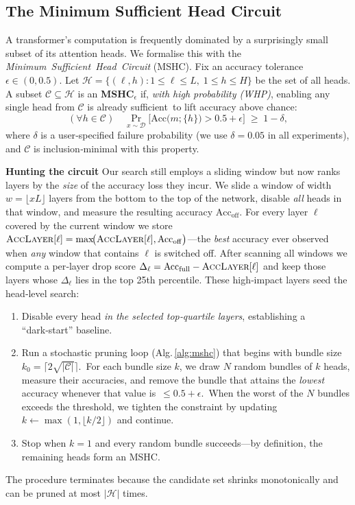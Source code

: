 \documentclass{article}
\begin{document}
\subsection{The Minimum Sufficient Head Circuit}
\label{subsec:mshc}

A transformer’s computation is frequently dominated by a surprisingly
small subset of its attention heads.  We formalise this with the
\emph{Minimum Sufficient Head Circuit} (MSHC).  Fix an accuracy tolerance
$\epsilon\in(0,0.5)$.  Let
$\mathcal H=\{(\ell,h):1\le\ell\le L,\;1\le h\le H\}$ be the set of all
heads.  A subset $\mathcal C\subseteq\mathcal H$ is an
\textbf{MSHC}${}_{\!\epsilon}$ if, \emph{with high probability (WHP)}, enabling any single head from $\mathcal C$ is already sufficient to lift accuracy above chance:
\[
  (\forall h\in\mathcal C)\quad
  \Pr_{x\sim\mathcal D}\!\bigl[\mathrm{Acc}\bigl(m;\{h\}\bigr) > 0.5+\epsilon\bigr] \;\ge\; 1-\delta,
\]
where $\delta$ is a user‑specified failure probability (we use $\delta=0.05$ in all experiments), and $\mathcal C$ is inclusion‑minimal with this property.


%
\noindent\textbf{Hunting the circuit}
Our search still employs a sliding window but now ranks layers by the \emph{size} of the accuracy loss they incur.  
We slide a window of width $w=\lfloor xL\rfloor$ layers from the bottom to the top of the network, disable \emph{all} heads in that window, and measure the resulting accuracy $\mathrm{Acc}_{\mathrm{off}}$.  
For every layer $\ell$ covered by the current window we store  
$\textsc{AccLayer}[\ell]=\max\!\bigl(\textsc{AccLayer}[\ell],\mathrm{Acc}_{\mathrm{off}}\bigr)$—the \emph{best} accuracy ever observed when \emph{any} window that contains $\ell$ is switched off.  
After scanning all windows we compute a per‑layer drop score  
$\Delta_\ell=\mathrm{Acc}_{\mathrm{full}}-\textsc{AccLayer}[\ell]$  
and keep those layers whose $\Delta_\ell$ lies in the top 25th percentile.  
These high‑impact layers seed the head‑level search:

\begin{enumerate}[label=\textbf{Step \arabic*.}, leftmargin=4em, itemsep=0pt]
\item Disable every head \emph{in the selected top‑quartile layers}, establishing a ``dark‑start'' baseline.
\item Run a stochastic pruning loop (Alg.\,\ref{alg:mshc}) that begins with bundle size $k_0=\lceil 2\sqrt{|\mathcal C|}\rceil$. For each bundle size $k$, we draw $N$ random bundles of $k$ heads, measure their accuracies, and remove the bundle that attains the \emph{lowest} accuracy whenever that value is $\le 0.5+\epsilon$. When the worst of the $N$ bundles exceeds the threshold, we tighten the constraint by updating $k\leftarrow\max(1,\lfloor k/2\rfloor)$ and continue.
\item Stop when $k=1$ and every random bundle succeeds—by definition, the remaining heads form an MSHC.
\end{enumerate}
The procedure terminates because the candidate set shrinks
monotonically and can be pruned at most $|\mathcal H|$ times.
\end{document}
